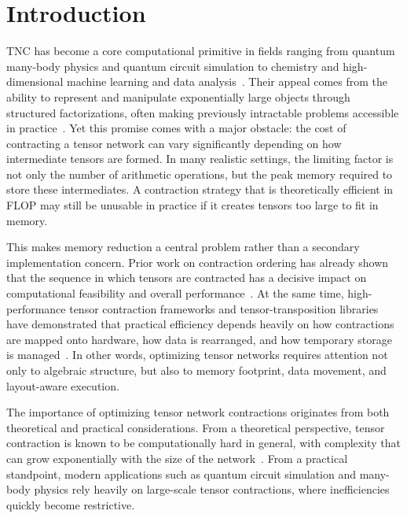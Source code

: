 
\chapter{Introduction}\label{chapter:introduction}

\ac{TNC} has become a core computational primitive in fields ranging from quantum many-body physics and quantum circuit simulation to chemistry and high-dimensional machine learning and data analysis~\cite{10806706}. Their appeal comes from the ability to represent and manipulate exponentially large objects through structured factorizations, often making previously intractable problems accessible in practice~\cite{evenbly2014improving}. Yet this promise comes with a major obstacle: the cost of contracting a tensor network can vary significantly depending on how intermediate tensors are formed. In many realistic settings, the limiting factor is not only the number of arithmetic operations, but the peak memory required to store these intermediates. A contraction strategy that is theoretically efficient in \ac{FLOP} may still be unusable in practice if it creates tensors too large to fit in memory.

This makes memory reduction a central problem rather than a secondary implementation concern. Prior work on contraction ordering has already shown that the sequence in which tensors are contracted has a decisive impact on computational feasibility and overall performance~\cite{pfeifer2014faster,schindler2020algorithms}. At the same time, high-performance tensor contraction frameworks and tensor-transposition libraries have demonstrated that practical efficiency depends heavily on how contractions are mapped onto hardware, how data is rearranged, and how temporary storage is managed~\cite{hirata2003tensor,DBLP:journals/corr/SpringerB16}. In other words, optimizing tensor networks requires attention not only to algebraic structure, but also to memory footprint, data movement, and layout-aware execution.

The importance of optimizing tensor network contractions originates from both theoretical and practical considerations. From a theoretical perspective, tensor contraction is known to be computationally hard in general, with complexity that can grow exponentially with the size of the network~\cite{pfeifer2014faster}. From a practical standpoint, modern applications such as quantum circuit simulation and many-body physics rely heavily on large-scale tensor contractions, where inefficiencies quickly become restrictive.


